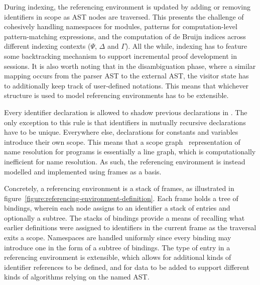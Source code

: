 During indexing, the referencing environment is updated by adding or removing identifiers in scope as \ac{AST} nodes are traversed.
This presents the challenge of cohesively handling namespaces for modules, patterns for computation-level pattern-matching expressions, and the computation of de Bruijn indices across different indexing contexts ($\Psi$, $\Delta$ and $\Gamma$).
All the while, indexing has to feature some backtracking mechanism to support incremental proof development in \Harpoon sessions.
It is also worth noting that in the disambiguation phase, where a similar mapping occurs from the parser \ac{AST} to the external \ac{AST}, the visitor state has to additionally keep track of user-defined notations.
This means that whichever structure is used to model referencing environments has to be extensible.


Every identifier declaration is allowed to shadow previous declarations in \Beluga.
The only exception to this rule is that identifiers in mutually recursive declarations have to be unique.
Everywhere else, declarations for constants and variables introduce their own scope.
This means that a scope graph~\cite{nameresolution} representation of name resolution for \Beluga programs is essentially a line graph, which is computationally inefficient for name resolution.
As such, the referencing environment is instead modelled and implemented using frames as a basis.

Concretely, a referencing environment is a stack of frames, as illustrated in figure~\ref{figure:referencing-environment-definition}.
Each frame holds a tree of bindings, wherein each node assigns to an identifier a stack of entries and optionally a subtree.
The stacks of bindings provide a means of recalling what earlier definitions were assigned to identifiers in the current frame as the traversal exits a scope.
Namespaces are handled uniformly since every binding may introduce one in the form of a subtree of bindings.
The type of entry in a referencing environment is extensible, which allows for additional kinds of identifier references to be defined, and for data to be added to support different kinds of algorithms relying on the named \ac{AST}.

